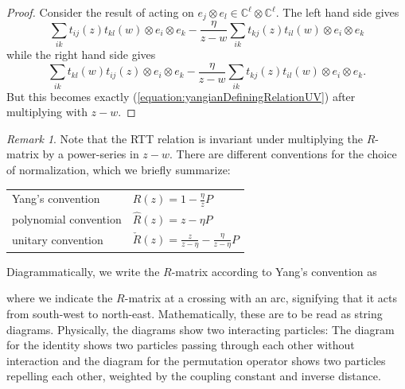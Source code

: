 \documentclass[11pt]{report}
\theoremstyle{definition}
\theoremstyle{remark}
\newtheorem*{remark}{Remark}
\theoremstyle{remark}
\newcommand{\C}{\mathbb{C}}
\begin{document}
\begin{proof}
Consider the result of acting on $e_j \otimes e_l \in \C^\ell \otimes \C^\ell$. The left hand side gives
\begin{equation*}
\sum_{ik} t_{ij}(z) t_{kl}(w) \otimes e_i \otimes e_k - \frac{\eta}{z-w} \sum_{ik} t_{kj}(z) t_{il}(w) \otimes e_i \otimes e_k
\end{equation*}
while the right hand side gives
\begin{equation*}
\sum_{ik} t_{kl}(w) t_{ij}(z) \otimes e_i \otimes e_k - \frac{\eta}{z-w} \sum_{ik} t_{kj}(z) t_{il}(w) \otimes e_i \otimes e_k.
\end{equation*}
But this becomes exactly (\ref{equation:yangianDefiningRelationUV}) after multiplying with $z-w$.
\end{proof}

\begin{remark}
Note that the RTT relation is invariant under multiplying the $R$-matrix by a power-series in $z-w$. There are different conventions for the choice of normalization, which we briefly summarize:
\begin{center}
\begin{tabular}{|l||l|}
\hline
Yang's convention & $R(z) = 1 - \frac{\eta}{z} P$ \\
polynomial convention & $\hat R(z) = z - \eta P$ \\
unitary convention & $\check R(z) = \frac{z}{z-\eta} - \frac{\eta}{z-\eta} P$ \\
\hline
\end{tabular}
\end{center}
Diagrammatically, we write the $R$-matrix according to Yang's convention as
~\\
\begin{center}
\end{center}
where we indicate the $R$-matrix at a crossing with an arc, signifying that it acts from south-west to north-east. Mathematically, these are to be read as string diagrams. Physically, the diagrams show two interacting particles: The diagram for the identity shows two particles passing through each other without interaction and the diagram for the permutation operator shows two particles repelling each other, weighted by the coupling constant and inverse distance.


\end{remark}
\end{document}
